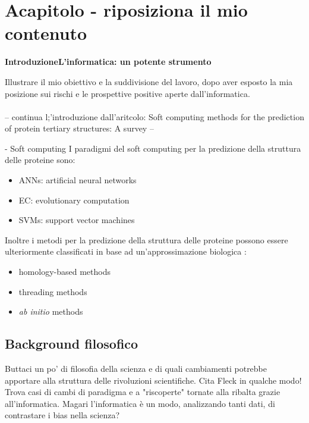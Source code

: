 \chapter{Acapitolo - riposiziona il mio contenuto}


\textbf{{\LARGE Introduzione\newline\newline L'informatica: un potente strumento}}
\vspace{1cm}

Illustrare il mio obiettivo e la suddivisione del lavoro, dopo aver esposto la mia posizione sui rischi e le prospettive positive aperte dall'informatica.\\\\


-- continua l;'introduzione dall'aritcolo: Soft computing methods for the prediction of protein tertiary
structures: A survey --


- Soft computing
I paradigmi del soft computing per la predizione della struttura delle proteine sono:
\begin{itemize}
\item ANNs: artificial neural networks
\item EC: evolutionary computation
\item SVMs: support vector machines
\end{itemize}
Inoltre i metodi per la predizione della struttura delle proteine possono essere ulteriormente classificati in base ad un'approssimazione biologica \cite{marquez2015soft}:
\begin{itemize}
	\item homology-based methods
	\item threading methods
	\item \textit{ab initio } methods
\end{itemize}


\section{Background filosofico}
Buttaci un po' di filosofia della scienza e di quali cambiamenti potrebbe apportare alla struttura delle rivoluzioni scientifiche. Cita Fleck in qualche modo!
Trova casi di cambi di paradigma e a "riscoperte" tornate alla ribalta grazie all'informatica. Magari l'informatica è un modo, analizzando tanti dati, di contrastare i bias nella scienza?



